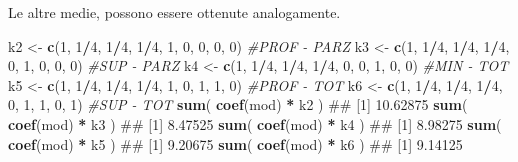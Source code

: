 \documentclass[a4paper,12pt,oneside]{book}
\newenvironment{Shaded}{\begin{snugshade}}{\end{snugshade}}
\newcommand{\KeywordTok}[1]{\textcolor[rgb]{0.13,0.29,0.53}{\textbf{#1}}}
\newcommand{\DecValTok}[1]{\textcolor[rgb]{0.00,0.00,0.81}{#1}}
\newcommand{\StringTok}[1]{\textcolor[rgb]{0.31,0.60,0.02}{#1}}
\newcommand{\CommentTok}[1]{\textcolor[rgb]{0.56,0.35,0.01}{\textit{#1}}}
\newcommand{\OperatorTok}[1]{\textcolor[rgb]{0.81,0.36,0.00}{\textbf{#1}}}
\newcommand{\NormalTok}[1]{#1}
\theoremstyle{definition}
\theoremstyle{definition}
\theoremstyle{definition}
\theoremstyle{remark}
\begin{document}
Le altre medie, possono essere ottenute analogamente.

\begin{Shaded}
\begin{Highlighting}[]
\NormalTok{k2 <-}\StringTok{ }\KeywordTok{c}\NormalTok{(}\DecValTok{1}\NormalTok{, }\DecValTok{1}\OperatorTok{/}\DecValTok{4}\NormalTok{, }\DecValTok{1}\OperatorTok{/}\DecValTok{4}\NormalTok{, }\DecValTok{1}\OperatorTok{/}\DecValTok{4}\NormalTok{, }\DecValTok{1}\NormalTok{, }\DecValTok{0}\NormalTok{, }\DecValTok{0}\NormalTok{, }\DecValTok{0}\NormalTok{, }\DecValTok{0}\NormalTok{) }\CommentTok{#PROF - PARZ}
\NormalTok{k3 <-}\StringTok{ }\KeywordTok{c}\NormalTok{(}\DecValTok{1}\NormalTok{, }\DecValTok{1}\OperatorTok{/}\DecValTok{4}\NormalTok{, }\DecValTok{1}\OperatorTok{/}\DecValTok{4}\NormalTok{, }\DecValTok{1}\OperatorTok{/}\DecValTok{4}\NormalTok{, }\DecValTok{0}\NormalTok{, }\DecValTok{1}\NormalTok{, }\DecValTok{0}\NormalTok{, }\DecValTok{0}\NormalTok{, }\DecValTok{0}\NormalTok{) }\CommentTok{#SUP - PARZ}
\NormalTok{k4 <-}\StringTok{ }\KeywordTok{c}\NormalTok{(}\DecValTok{1}\NormalTok{, }\DecValTok{1}\OperatorTok{/}\DecValTok{4}\NormalTok{, }\DecValTok{1}\OperatorTok{/}\DecValTok{4}\NormalTok{, }\DecValTok{1}\OperatorTok{/}\DecValTok{4}\NormalTok{, }\DecValTok{0}\NormalTok{, }\DecValTok{0}\NormalTok{, }\DecValTok{1}\NormalTok{, }\DecValTok{0}\NormalTok{, }\DecValTok{0}\NormalTok{) }\CommentTok{#MIN - TOT}
\NormalTok{k5 <-}\StringTok{ }\KeywordTok{c}\NormalTok{(}\DecValTok{1}\NormalTok{, }\DecValTok{1}\OperatorTok{/}\DecValTok{4}\NormalTok{, }\DecValTok{1}\OperatorTok{/}\DecValTok{4}\NormalTok{, }\DecValTok{1}\OperatorTok{/}\DecValTok{4}\NormalTok{, }\DecValTok{1}\NormalTok{, }\DecValTok{0}\NormalTok{, }\DecValTok{1}\NormalTok{, }\DecValTok{1}\NormalTok{, }\DecValTok{0}\NormalTok{) }\CommentTok{#PROF - TOT}
\NormalTok{k6 <-}\StringTok{ }\KeywordTok{c}\NormalTok{(}\DecValTok{1}\NormalTok{, }\DecValTok{1}\OperatorTok{/}\DecValTok{4}\NormalTok{, }\DecValTok{1}\OperatorTok{/}\DecValTok{4}\NormalTok{, }\DecValTok{1}\OperatorTok{/}\DecValTok{4}\NormalTok{, }\DecValTok{0}\NormalTok{, }\DecValTok{1}\NormalTok{, }\DecValTok{1}\NormalTok{, }\DecValTok{0}\NormalTok{, }\DecValTok{1}\NormalTok{) }\CommentTok{#SUP - TOT}
\KeywordTok{sum}\NormalTok{( }\KeywordTok{coef}\NormalTok{(mod) }\OperatorTok{*}\StringTok{ }\NormalTok{k2 )}
\NormalTok{## [1] 10.62875}
\KeywordTok{sum}\NormalTok{( }\KeywordTok{coef}\NormalTok{(mod) }\OperatorTok{*}\StringTok{ }\NormalTok{k3 )}
\NormalTok{## [1] 8.47525}
\KeywordTok{sum}\NormalTok{( }\KeywordTok{coef}\NormalTok{(mod) }\OperatorTok{*}\StringTok{ }\NormalTok{k4 )}
\NormalTok{## [1] 8.98275}
\KeywordTok{sum}\NormalTok{( }\KeywordTok{coef}\NormalTok{(mod) }\OperatorTok{*}\StringTok{ }\NormalTok{k5 )}
\NormalTok{## [1] 9.20675}
\KeywordTok{sum}\NormalTok{( }\KeywordTok{coef}\NormalTok{(mod) }\OperatorTok{*}\StringTok{ }\NormalTok{k6 )}
\NormalTok{## [1] 9.14125}
\end{Highlighting}
\end{Shaded}
\end{document}
